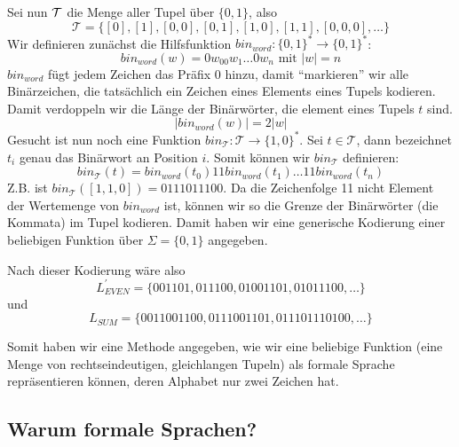 \noindent
Sei nun $\cal{T}$ die Menge aller Tupel über $\{0,1\}$, also
\[
    \mathcal{T} = \{[0], [1], [0,0], [0,1], [1,0], [1,1], [0,0,0], \ldots \}
\]
Wir definieren zunächst die Hilfsfunktion $bin_{word}: \{0,1\}^* \rightarrow \{0,1\}^*$:
\[
    bin_{word}(w) = 0w_00w_1\ldots0w_n \text{ mit } |w| = n
\]
$bin_{word}$ fügt jedem Zeichen das Präfix 0 hinzu,
damit ``markieren'' wir alle Binärzeichen,
die tatsächlich ein Zeichen eines Elements eines Tupels kodieren.
Damit verdoppeln wir die Länge der Binärwörter, die element eines Tupels $t$ sind.
\[
    |bin_{word}(w)| = 2|w| 
\]
Gesucht ist nun noch eine Funktion $bin_{\mathcal{T}}: \mathcal{T} \rightarrow \{1,0\}^*$.
Sei $t \in \mathcal{T}$, dann bezeichnet $t_i$ genau das Binärwort an Position $i$.
Somit können wir $bin_{\mathcal{T}}$ definieren:
\[
    bin_{\mathcal{T}}(t) = bin_{word}(t_0)11bin_{word}(t_1)\ldots 11bin_{word}(t_{n})
\]
Z.B. ist $bin_{\mathcal{T}}([1,1,0]) = 0111011100$.
Da die Zeichenfolge 11 nicht Element der Wertemenge von $bin_{word}$ ist,
können wir so die Grenze der Binärwörter (die Kommata) im Tupel kodieren.
Damit haben wir eine generische Kodierung einer beliebigen Funktion
über $\Sigma = \{0,1\}$ angegeben.

Nach dieser Kodierung wäre also 
\[
    L_{EVEN}^{'} = \{001101, 011100, 01001101, 01011100, \ldots \}
\]
und
\[
    L_{SUM} = \{0011001100, 0111001101, 011101110100, \ldots \}
\]

Somit haben wir eine Methode angegeben,
wie wir eine beliebige Funktion
(eine Menge von rechtseindeutigen, gleichlangen Tupeln)
als formale Sprache repräsentieren können,
deren Alphabet nur zwei Zeichen hat.


\subsection{Warum formale Sprachen?}\label{subsec:warumFormaleSprachen}

